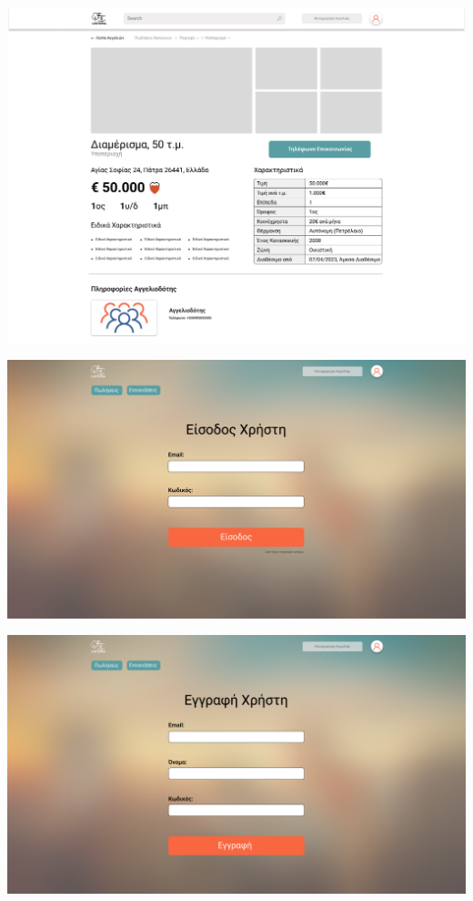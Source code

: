\documentclass{beamer}
\begin{document}
\begin{frame}
	\includegraphics[width=\textwidth]{"Listing.png"}
\end{frame}

\begin{frame}
	\includegraphics[width=\textwidth]{"Sign in.png"}
\end{frame}

\begin{frame}
	\includegraphics[width=\textwidth]{"Sign up.png"}
\end{frame}
\end{document}
